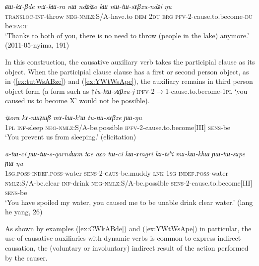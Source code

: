 \documentclass[oneside,a4paper,11pt]{article}
\newcommand{\ipa}[1]{\textit{\phon#1}}
\newcommand{\refb}[1]{(\ref{#1})}
\begin{document}
   
\begin{exe}
\ex  \label{ex:CWkABde}
\gll
   \ipa{ɕɯ-kɤ-βde} 	\ipa{mɤ-kɯ-ra} 	\ipa{nɯ} 	\ipa{ndʑiʑo} 	\ipa{kɯ} 	\ipa{nɯ-tɯ-sɤβzu-ndʑi} 	\ipa{ŋu} \\
\textsc{transloc-inf}-throw  \textsc{neg-nmlz}:S/A-have.to \textsc{dem} \textsc{2du} \textsc{erg} \textsc{pfv}-2-cause.to.become-\textsc{du} be:\textsc{fact} \\
\glt `Thanks to both of you, there is no need to throw (people in the lake) anymore.' (2011-05-nyima, 191)
\end{exe}

In this construction, the causative auxiliary verb takes the participial clause  as its object. When the participial clause clause has a first or second person object, as in \refb{ex:tutWsABze} and \refb{ex:YWtWsApe}, the auxiliary remains in third person object form (a form such as $\dagger$\ipa{tu-kɯ-sɤβzu-j} \textsc{ipfv}-2$\rightarrow$1-cause.to.become-\textsc{1pl}  `you caused us to become X' would not be possible).

\begin{exe}
\ex  \label{ex:tutWsABze}
\gll 
 \ipa{iʑora} 	\ipa{kɤ-nɯʑɯβ} 	\ipa{mɤ-kɯ-kʰɯ} 	\ipa{tu-tɯ-sɤβze} 	\ipa{ɲɯ-ŋu}  \\
 \textsc{1pl} \textsc{inf}-sleep \textsc{neg-nmlz}:S/A-be.possible \textsc{ipfv}-2-cause.to.become[III] \textsc{sens}-be \\
\glt `You prevent us from sleeping.' (elicitation)
 \end{exe}
 
 \begin{exe}
\ex  \label{ex:YWtWsApe}
\gll 
 \ipa{a-tɯ-ci} 	\ipa{ɲɯ-tɯ-s-qarndɯm} 	\ipa{tɕe} 	\ipa{aʑo} 	\ipa{tɯ-ci} 	\ipa{kɯ-ɤmgri} 	\ipa{kɤ-tsʰi} 	\ipa{mɤ-kɯ-khɯ} 	\ipa{ɲɯ-tɯ-sɤpe} 	\ipa{ɲɯ-ŋu}  \\
\textsc{1sg.poss-indef.poss}-water \textsc{sens-2-caus}-be.muddy \textsc{lnk} \textsc{1sg} \textsc{indef.poss}-water \textsc{nmlz}:S/A-be.clear \textsc{inf}-drink \textsc{neg}-\textsc{nmlz}:S/A-be.possible \textsc{sens}-2-cause.to.become[III] \textsc{sens}-be \\
\glt `You have spoiled my water, you caused me to be unable drink clear water.' (lang he yang, 26)
 \end{exe}
 
 As shown by examples \refb{ex:CWkABde} and \refb{ex:YWtWsApe} in particular, the use of causative auxiliaries with dynamic verbs is common to express indirect causation, the (voluntary or involuntary) indirect result of the action performed by the causer.
   
\end{document}
